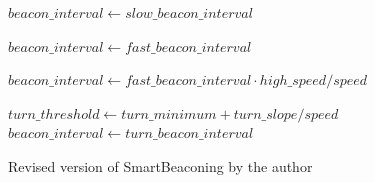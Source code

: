 \begin{figure}[p]
\begin{algorithmic}
	\State $beacon\_interval\gets slow\_beacon\_interval$

\Else
		\State $beacon\_interval\gets fast\_beacon\_interval$    

	\Else
		\State $beacon\_interval\gets fast\_beacon\_interval \cdot high\_speed / speed$

	\EndIf


	\State $turn\_threshold\gets turn\_minimum + turn\_slope / speed$
		\State $beacon\_interval\gets turn\_beacon\_interval$

	\EndIf
\EndIf

	\State {}

\EndIf
\end{algorithmic}
\caption{Revised version of SmartBeaconing by the author}
\label{fig:kwfsmartbeacon}
\end{figure}




